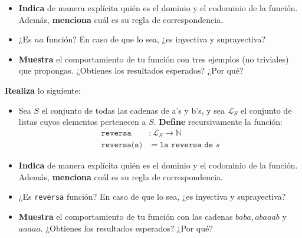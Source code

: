 \documentclass[oneside]{style}
\begin{document}
\begin{questions}[label=\protect\circled{\bfseries\arabic*}]
{\begin{itemize}
            \item \textbf{Indica} de manera explícita quién es el dominio y el 
            codominio de la función. Además, \textbf{menciona} cuál es su regla 
            de correspondencia.

            \item ¿Es $na$ función? En caso de que lo sea, ¿es inyectiva y 
            suprayectiva?

            \item \textbf{Muestra} el comportamiento de tu función con tres 
            ejemplos (no triviales) que propongas. ¿Obtienes los resultados 
            esperados? ¿Por qué?
        \end{itemize}
    }

    \newpage
    \question
    {
        \textbf{Realiza} lo siguiente:
        \begin{itemize}
            \item Sea $S$ el conjunto de todas las cadenas de a's y b's, y sea 
            $\mathcal{L}_S$ el conjunto de listas cuyos elementos pertenecen a 
            $S$. \textbf{Define} recursivamente la función:
            \begin{align*}
                \texttt{reversa}&: \mathcal{L}_S \rightarrow \mathbb{N} \\ 
                \texttt{reversa(s)} &= \texttt{la reversa de } s 
            \end{align*}

            \item \textbf{Indica} de manera explícita quién es el dominio y el 
            codominio de la función. Además, \textbf{menciona} cuál es su regla 
            de correspondencia.

            \item ¿Es \texttt{reversa} función? En caso de que lo sea, ¿es 
            inyectiva y suprayectiva?

            \item \textbf{Muestra} el comportamiento de tu función con las 
            cadenas $baba, abaaab$ y $aaaaa$. ¿Obtienes los resultados esperados?
            ¿Por qué?
        \end{itemize}
    }


\end{questions}
\end{document}
